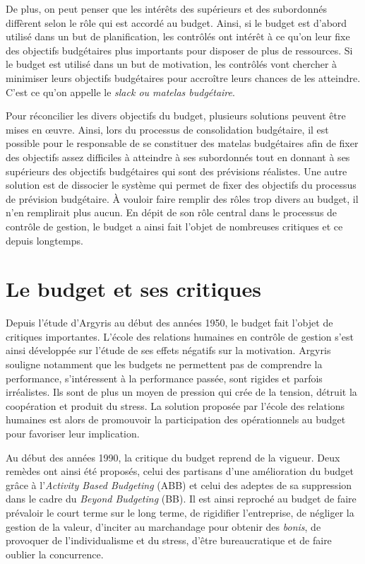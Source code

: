 \documentclass[oneside]{kaobook}
\begin{document}
De plus, on peut penser que les intérêts des supérieurs et des subordonnés diffèrent selon le rôle qui est accordé au budget. Ainsi, si le budget est d'abord utilisé dans un but de planification, les contrôlés ont intérêt à ce qu'on leur fixe des objectifs budgétaires plus importants pour disposer de plus de ressources. Si le budget est utilisé dans un but de motivation, les contrôlés vont chercher à minimiser leurs objectifs budgétaires pour accroître leurs chances de les atteindre. C'est ce qu'on appelle le \emph{slack ou matelas budgétaire}. 

Pour réconcilier les divers objectifs du budget, plusieurs solutions peuvent être mises en œuvre. Ainsi, lors du processus de consolidation budgétaire, il est possible pour le responsable de se constituer des matelas budgétaires afin de fixer des objectifs assez difficiles à atteindre à ses subordonnés tout en donnant à ses supérieurs des objectifs budgétaires qui sont des prévisions réalistes. Une autre solution est de dissocier le système qui permet de fixer des objectifs du processus de prévision budgétaire. À vouloir faire remplir des rôles trop divers au budget, il n'en remplirait plus aucun. En dépit de son rôle central dans le processus de contrôle de gestion, le budget a ainsi fait l'objet de nombreuses critiques et ce depuis longtemps.

\section{Le budget et ses critiques}
\label{sec:orgdfd79cc}
Depuis l'étude d'Argyris au début des années 1950, le budget fait l'objet de critiques importantes. L'école des relations humaines en contrôle de gestion s'est ainsi développée sur l'étude de ses effets négatifs sur la motivation. Argyris souligne notamment que les budgets ne permettent pas de comprendre la performance, s'intéressent à la performance passée, sont rigides et parfois irréalistes. Ils sont de plus un moyen de pression qui crée de la tension, détruit la coopération et produit du stress. La solution proposée par l'école des relations humaines est alors de promouvoir la participation des opérationnels au budget pour favoriser leur implication.

Au début des années 1990, la critique du budget reprend de la vigueur. Deux remèdes ont ainsi été proposés, celui des partisans d'une amélioration du budget grâce à l'\emph{Activity Based Budgeting} (ABB) et celui des adeptes de sa suppression dans le cadre du \emph{Beyond Budgeting} (BB). Il est ainsi reproché au budget de faire prévaloir le court terme sur le long terme, de rigidifier l'entreprise, de négliger la gestion de la valeur, d'inciter au marchandage pour obtenir des \emph{bonis}, de provoquer de l'individualisme et du stress, d'être bureaucratique et de faire oublier la concurrence.
\end{document}
